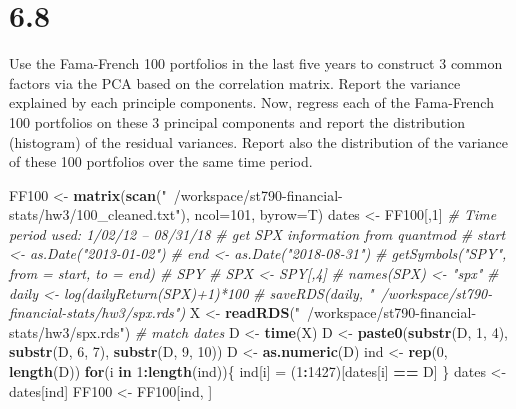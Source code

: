 \documentclass[11pt,]{article}
\newenvironment{Shaded}{\begin{snugshade}}{\end{snugshade}}
\newcommand{\CommentTok}[1]{\textcolor[rgb]{0.56,0.35,0.01}{\textit{#1}}}
\newcommand{\ControlFlowTok}[1]{\textcolor[rgb]{0.13,0.29,0.53}{\textbf{#1}}}
\newcommand{\DataTypeTok}[1]{\textcolor[rgb]{0.13,0.29,0.53}{#1}}
\newcommand{\DecValTok}[1]{\textcolor[rgb]{0.00,0.00,0.81}{#1}}
\newcommand{\KeywordTok}[1]{\textcolor[rgb]{0.13,0.29,0.53}{\textbf{#1}}}
\newcommand{\NormalTok}[1]{#1}
\newcommand{\OperatorTok}[1]{\textcolor[rgb]{0.81,0.36,0.00}{\textbf{#1}}}
\newcommand{\StringTok}[1]{\textcolor[rgb]{0.31,0.60,0.02}{#1}}
\begin{document}
\newpage

\hypertarget{section-3}{%
\section{6.8}\label{section-3}}

Use the Fama-French 100 portfolios in the last five years to construct 3
common factors via the PCA based on the correlation matrix. Report the
variance explained by each principle components. Now, regress each of
the Fama-French 100 portfolios on these 3 principal components and
report the distribution (histogram) of the residual variances. Report
also the distribution of the variance of these 100 portfolios over the
same time period.

\begin{Shaded}
\begin{Highlighting}[]
\NormalTok{FF100 <-}\StringTok{ }\KeywordTok{matrix}\NormalTok{(}\KeywordTok{scan}\NormalTok{(}\StringTok{"~/workspace/st790-financial-stats/hw3/100_cleaned.txt"}\NormalTok{), }
                \DataTypeTok{ncol=}\DecValTok{101}\NormalTok{, }\DataTypeTok{byrow=}\NormalTok{T)}
\NormalTok{dates <-}\StringTok{ }\NormalTok{FF100[,}\DecValTok{1}\NormalTok{] }\CommentTok{# Time period used: 1/02/12 -- 08/31/18}
\CommentTok{# get SPX information from quantmod  }
\CommentTok{# start <- as.Date("2013-01-02")}
\CommentTok{# end <- as.Date("2018-08-31")}
\CommentTok{# getSymbols("SPY", from = start, to = end) # SPY}
\CommentTok{# SPX <- SPY[,4]}
\CommentTok{# names(SPX) <- "spx"}
\CommentTok{# daily <- log(dailyReturn(SPX)+1)*100}
\CommentTok{# saveRDS(daily, "~/workspace/st790-financial-stats/hw3/spx.rds")}
\NormalTok{X <-}\StringTok{ }\KeywordTok{readRDS}\NormalTok{(}\StringTok{"~/workspace/st790-financial-stats/hw3/spx.rds"}\NormalTok{)}
\CommentTok{# match dates }
\NormalTok{D <-}\StringTok{ }\KeywordTok{time}\NormalTok{(X) }
\NormalTok{D <-}\StringTok{ }\KeywordTok{paste0}\NormalTok{(}\KeywordTok{substr}\NormalTok{(D, }\DecValTok{1}\NormalTok{, }\DecValTok{4}\NormalTok{), }\KeywordTok{substr}\NormalTok{(D, }\DecValTok{6}\NormalTok{, }\DecValTok{7}\NormalTok{), }\KeywordTok{substr}\NormalTok{(D, }\DecValTok{9}\NormalTok{, }\DecValTok{10}\NormalTok{))}
\NormalTok{D <-}\StringTok{ }\KeywordTok{as.numeric}\NormalTok{(D)}
\NormalTok{ind <-}\StringTok{ }\KeywordTok{rep}\NormalTok{(}\DecValTok{0}\NormalTok{, }\KeywordTok{length}\NormalTok{(D)) }
\ControlFlowTok{for}\NormalTok{(i }\ControlFlowTok{in} \DecValTok{1}\OperatorTok{:}\KeywordTok{length}\NormalTok{(ind))\{}
\NormalTok{  ind[i] =}\StringTok{ }\NormalTok{(}\DecValTok{1}\OperatorTok{:}\DecValTok{1427}\NormalTok{)[dates[i] }\OperatorTok{==}\StringTok{ }\NormalTok{D]}
\NormalTok{\}}
\NormalTok{dates <-}\StringTok{ }\NormalTok{dates[ind]}
\NormalTok{FF100 <-}\StringTok{ }\NormalTok{FF100[ind, ]}


\end{Highlighting}
\end{Shaded}
\end{document}
